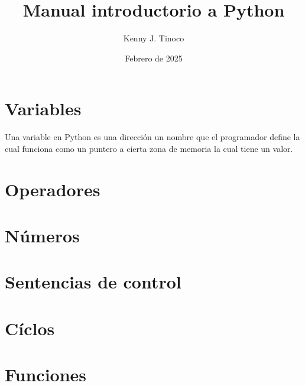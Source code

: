 \documentclass[12pt]{article}
\title{Manual introductorio a Python}
\author{Kenny J. Tinoco}
\date{Febrero de 2025}
\begin{document}
    \maketitle

    \section{Variables}
    Una variable en Python es una dirección un nombre que el programador define la cual funciona como un puntero a cierta zona de memoria la cual tiene un valor.
    
    \section{Operadores}
    
    \section{Números}
    
    \section{Sentencias de control}

    \section{Cíclos}
    
    \section{Funciones}
\end{document}
